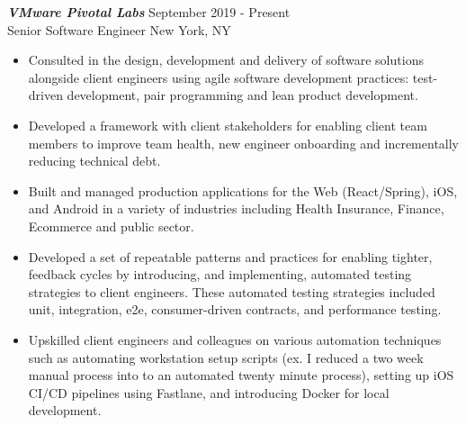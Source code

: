 {\sl \textbf{VMware Pivotal Labs}} \hfill September 2019 - Present \\ Senior Software Engineer \hfill New York, NY
\begin{itemize}
    \item Consulted in the design, development and delivery of software solutions alongside client engineers using agile software development practices: test-driven development, pair programming and lean product development.
    \item Developed a framework with client stakeholders for enabling client team members to improve team health, new engineer onboarding and incrementally reducing technical debt.
    \item Built and managed production applications for the Web (React/Spring), iOS, and Android in a variety of industries including Health Insurance, Finance, Ecommerce and public sector.
    \item Developed a set of repeatable patterns and practices for enabling tighter, feedback cycles by introducing, and implementing, automated testing strategies to client engineers. These automated testing strategies included unit, integration, e2e, consumer-driven contracts, and performance testing.
    \item Upskilled client engineers and colleagues on various automation techniques such as automating workstation setup scripts (ex. I reduced a two week manual process into to an automated twenty minute process), setting up iOS CI/CD pipelines using Fastlane, and introducing Docker for local development.
\end{itemize}
